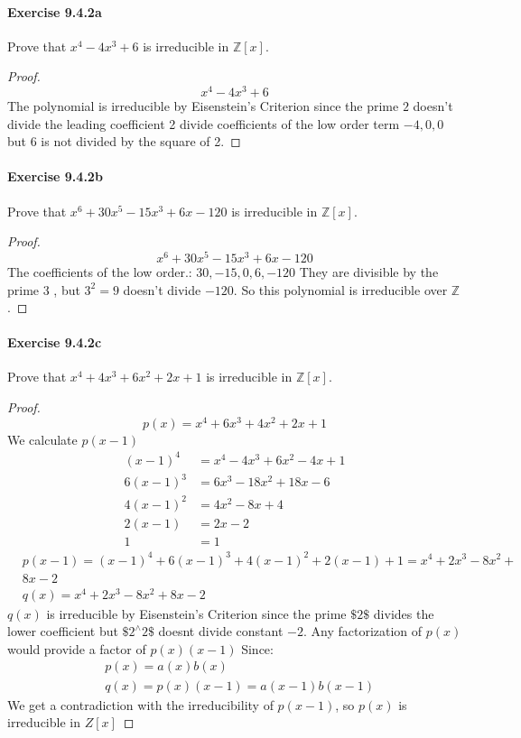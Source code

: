 \documentclass{article}
\theoremstyle{definition}
\begin{document}
\paragraph{Exercise 9.4.2a} Prove that $x^4-4x^3+6$ is irreducible in $\mathbb{Z}[x]$.
\begin{proof}
$$
x^4-4 x^3+6
$$
The polynomial is irreducible by Eisenstein's Criterion since the prime $2$ doesn't divide the leading coefficient 2 divide coefficients of the low order term $-4,0,0$ but 6 is not divided by the square of 2.
\end{proof}



\paragraph{Exercise 9.4.2b} Prove that $x^6+30x^5-15x^3 + 6x-120$ is irreducible in $\mathbb{Z}[x]$.
\begin{proof}
    $$
x^6+30 x^5-15 x^3+6 x-120
$$
The coefficients of the low order.: $30,-15,0,6,-120$
They are divisible by the prime 3 , but $3^2=9$ doesn't divide $-120$. So this polynomial is irreducible over $\mathbb{Z}$. 
\end{proof}



\paragraph{Exercise 9.4.2c} Prove that $x^4+4x^3+6x^2+2x+1$ is irreducible in $\mathbb{Z}[x]$.
\begin{proof}
$$
p(x)=x^4+6 x^3+4 x^2+2 x+1
$$
We calculate $p(x-1)$
$$
\begin{aligned}
(x-1)^4 & =x^4-4 x^3+6 x^2-4 x+1 \\
6(x-1)^3 & =6 x^3-18 x^2+18 x-6 \\
4(x-1)^2 & =4 x^2-8 x+4 \\
2(x-1) & =2 x-2 \\
1 & =1
\end{aligned}
$$
$$
\begin{aligned}
& p(x-1)=(x-1)^4+6(x-1)^3+4(x-1)^2+2(x-1)+1=x^4+2 x^3-8 x^2+ \\
& 8 x-2 \\
& q(x)=x^4+2 x^3-8 x^2+8 x-2
\end{aligned}
$$
$q(x)$ is irreducible by Eisenstein's Criterion since the prime $\$ 2 \$$ divides the lower coefficient but $\$ 2^{\wedge} 2 \$$ doesnt divide constant $-2$. Any factorization of $p(x)$ would provide a factor of $p(x)(x-1)$
Since:
$$
\begin{aligned}
& p(x)=a(x) b(x) \\
& q(x)=p(x)(x-1)=a(x-1) b(x-1)
\end{aligned}
$$
We get a contradiction with the irreducibility of $p(x-1)$, so $p(x)$ is irreducible in $Z[x]$
\end{proof}
\end{document}
